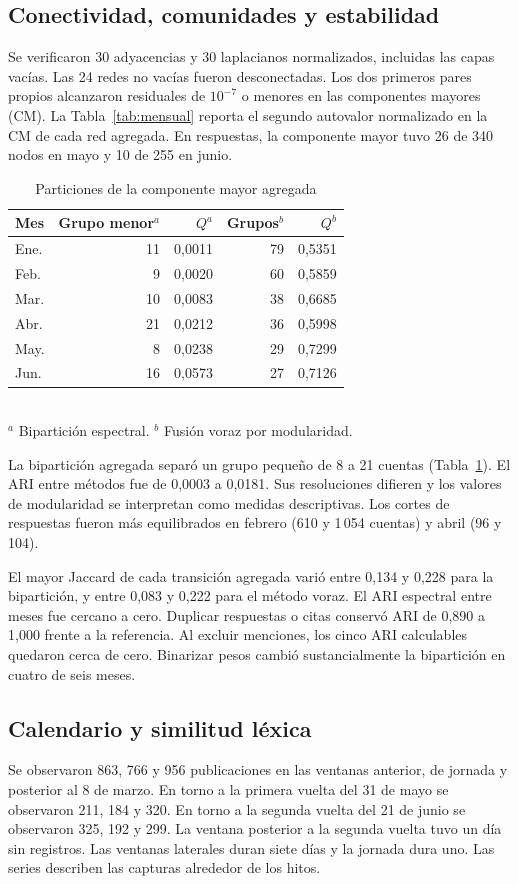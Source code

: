 \documentclass[journal]{IEEEtran}
\begin{document}
\subsection{Conectividad, comunidades y estabilidad}
Se verificaron 30 adyacencias y 30 laplacianos normalizados, incluidas las capas vacías. Las 24 redes no vacías fueron desconectadas. Los dos primeros pares propios alcanzaron residuales de $10^{-7}$ o menores en las componentes mayores (CM). La Tabla~\ref{tab:mensual} reporta el segundo autovalor normalizado en la CM de cada red agregada. En respuestas, la componente mayor tuvo 26 de 340 nodos en mayo y 10 de 255 en junio.

\begin{table}[t]
\centering
\caption{Particiones de la componente mayor agregada}
\label{tab:grupos}
\begin{tabular}{lrrrr}
\toprule
Mes & Grupo menor$^{a}$ & $Q^{a}$ & Grupos$^{b}$ & $Q^{b}$\\
\midrule
Ene. & 11 & 0,0011 & 79 & 0,5351\\
Feb. & 9 & 0,0020 & 60 & 0,5859\\
Mar. & 10 & 0,0083 & 38 & 0,6685\\
Abr. & 21 & 0,0212 & 36 & 0,5998\\
May. & 8 & 0,0238 & 29 & 0,7299\\
Jun. & 16 & 0,0573 & 27 & 0,7126\\
\bottomrule
\end{tabular}\\
\footnotesize $^{a}$ Bipartición espectral. $^{b}$ Fusión voraz por modularidad.
\end{table}

La bipartición agregada separó un grupo pequeño de 8 a 21 cuentas (Tabla~\ref{tab:grupos}). El ARI entre métodos fue de 0,0003 a 0,0181. Sus resoluciones difieren y los valores de modularidad se interpretan como medidas descriptivas. Los cortes de respuestas fueron más equilibrados en febrero (610 y 1\,054 cuentas) y abril (96 y 104).

El mayor Jaccard de cada transición agregada varió entre 0,134 y 0,228 para la bipartición, y entre 0,083 y 0,222 para el método voraz. El ARI espectral entre meses fue cercano a cero. Duplicar respuestas o citas conservó ARI de 0,890 a 1,000 frente a la referencia. Al excluir menciones, los cinco ARI calculables quedaron cerca de cero. Binarizar pesos cambió sustancialmente la bipartición en cuatro de seis meses.

\subsection{Calendario y similitud léxica}
Se observaron 863, 766 y 956 publicaciones en las ventanas anterior, de jornada y posterior al 8 de marzo. En torno a la primera vuelta del 31 de mayo se observaron 211, 184 y 320. En torno a la segunda vuelta del 21 de junio se observaron 325, 192 y 299. La ventana posterior a la segunda vuelta tuvo un día sin registros. Las ventanas laterales duran siete días y la jornada dura uno. Las series describen las capturas alrededor de los hitos.
\end{document}
